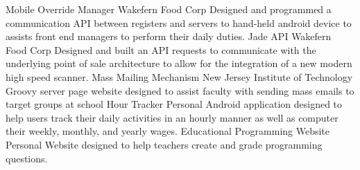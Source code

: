 \begin{entrylist}
    \entry
    {}
    {Mobile Override Manager}
    {Wakefern Food Corp}
    {Designed and programmed a communication API between registers and servers to hand-held android device to assists front end managers to perform their daily duties.}
    \entry
    {}
    {Jade API}
    {Wakefern Food Corp}
    {Designed and built an API requests to communicate with the underlying point of sale architecture to allow for the integration of a new modern high speed scanner.}
  \entry
    {}
    {Mass Mailing Mechanism}
    {New Jersey Institute of Technology}
    {Groovy server page website designed to assist faculty with sending mass emails to target groups at school}
    \entry
    {}
    {Hour Tracker}
    {Personal}
    {Android application designed to help users track their daily activities in an hourly manner as well as computer their weekly, monthly, and yearly wages.}
    \entry
    {}
    {Educational Programming Website}
    {Personal}
    {Website designed to help teachers create and grade programming questions.}
\end{entrylist}

\nolinebreak
